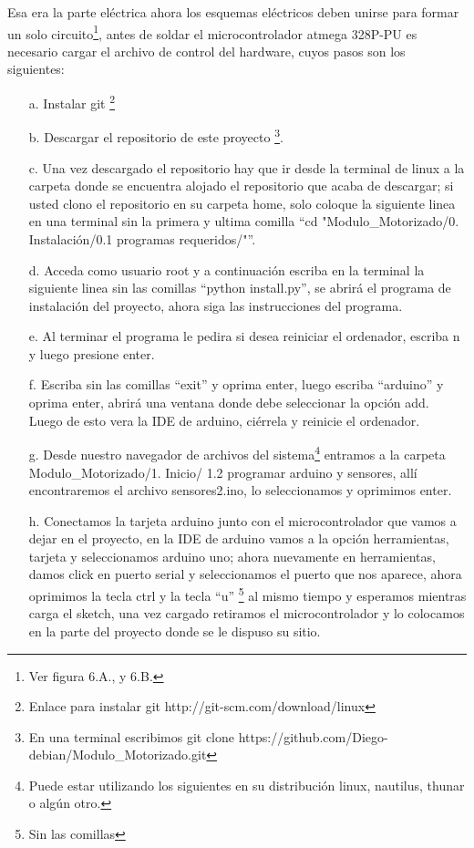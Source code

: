 \documentclass[12]{article}
\begin{document}
\begin{multicols}{2}
Esa era la parte eléctrica ahora los esquemas eléctricos deben unirse para formar un solo circuito\footnote{Ver figura 6.A., y 6.B.}, antes de soldar el microcontrolador atmega 328P-PU es necesario cargar el archivo de control del hardware, cuyos pasos son los siguientes:
\begin{enumerate}
\item[a.] Instalar git \footnote{Enlace para instalar git  http://git-scm.com/download/linux }
\item[b.] Descargar el repositorio de este proyecto \footnote{En una terminal escribimos git  clone https://github.com/Diego-debian/Modulo\_Motorizado.git}.
\item[c.] Una vez descargado el repositorio hay que ir desde la terminal de linux a la carpeta donde se encuentra alojado el repositorio que acaba de descargar; si usted clono el repositorio en su carpeta home, solo coloque la siguiente linea en una terminal  sin la primera y ultima comilla “cd "Modulo\_Motorizado/0. Instalación/0.1 programas requeridos/"”.
\item[d.] Acceda como usuario root y a continuación escriba en la terminal la siguiente linea sin las comillas “python install.py”, se abrirá el programa de instalación del proyecto, ahora siga las instrucciones del programa.
\item[e.] Al terminar el programa le pedira si desea reiniciar el ordenador, escriba n y luego presione enter.
\item[f.] Escriba sin las comillas “exit” y oprima enter, luego escriba “arduino” y oprima enter, abrirá una ventana donde debe seleccionar la opción add. Luego de esto vera la IDE de arduino, ciérrela y reinicie el ordenador.
\item[g.] Desde nuestro navegador de archivos del sistema\footnote{Puede estar utilizando los siguientes en su distribución linux, nautilus, thunar o algún otro.}  entramos a la carpeta Modulo\_Motorizado/1. Inicio/ 1.2 programar arduino y sensores, allí encontraremos el archivo sensores2.ino, lo seleccionamos y oprimimos enter.
\item[h.] Conectamos la tarjeta arduino junto con el microcontrolador que vamos a dejar en el proyecto, en la IDE de arduino vamos a la opción herramientas,  tarjeta y seleccionamos arduino uno;  ahora nuevamente en herramientas, damos click en puerto serial y seleccionamos el puerto que nos aparece,  ahora oprimimos la tecla ctrl y la tecla “u” \footnote{Sin las comillas} al mismo tiempo y esperamos mientras carga el sketch, una vez cargado retiramos el microcontrolador y lo colocamos en la parte del proyecto donde se le dispuso su sitio.   
\end{enumerate}


\end{multicols}
\end{document}
